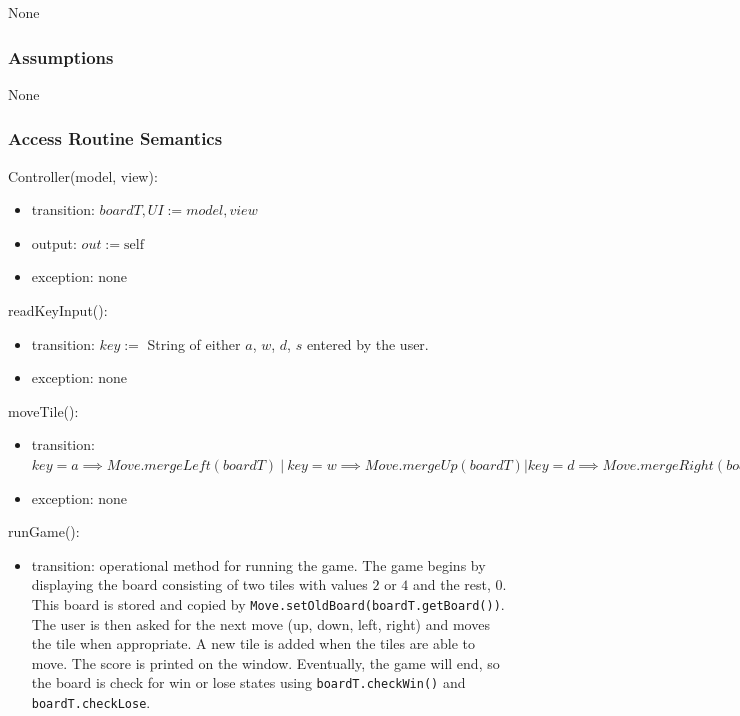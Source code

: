 \documentclass[12pt]{article}
\begin{document}
None

\subsubsection* {Assumptions}

None

\subsubsection* {Access Routine Semantics}

\noindent Controller(model, view):
\begin{itemize}
\item transition: $boardT, UI := model, view$
\item output: $out := \mbox{self}$
\item exception: none
\end{itemize}

\noindent readKeyInput():
\begin{itemize}
\item transition: 
$key :=$ String of either $a$, $w$, $d$, $s$ entered by the user.
\item exception: none
\end{itemize}

\noindent moveTile():
\begin{itemize}
\item transition: $key = a \implies Move.mergeLeft(boardT)\ |\ key = w \implies Move.mergeUp(boardT) | key = d \implies Move.mergeRight(boardT)\ |\ key = s \implies Move.mergeDown(boardT)$
\item exception: none
\end{itemize}


\noindent runGame():
\begin{itemize}
\item transition: operational method for running the game. The game begins by displaying the board consisting of two tiles with values $2$ or $4$ and the rest, $0$. This board is stored and copied by \verb|Move.setOldBoard(boardT.getBoard())|. The user is then asked for the next move (up, down, left, right) and moves the tile when appropriate. A new tile is added when the tiles are able to move. The score is printed on the window. Eventually, the game will end, so the board is check for win or lose states using \verb|boardT.checkWin()| and \verb|boardT.checkLose|. 
\end{itemize}

\newpage
\end{document}
